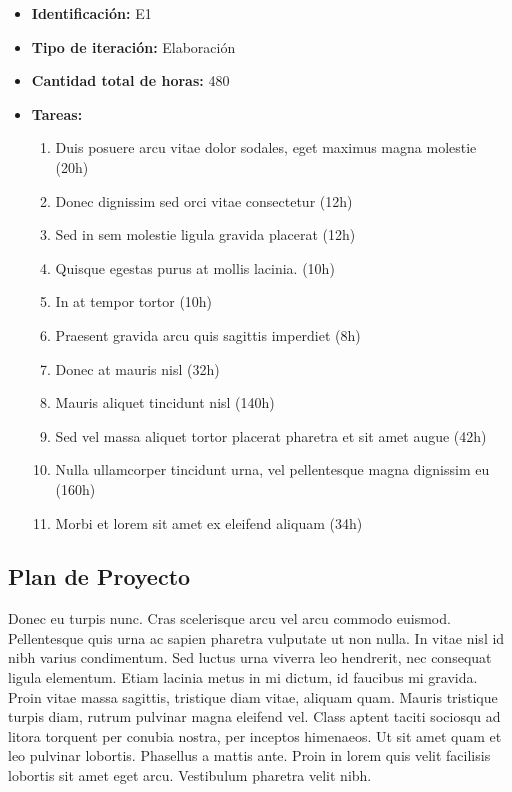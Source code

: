 \documentclass[a4paper, 10pt, twoside]{article}
\begin{document}
\begin{itemize}
  \item \textbf{Identificación:} E1
  \item \textbf{Tipo de iteración:} Elaboración
  \item \textbf{Cantidad total de horas:} 480
  \item \textbf{Tareas:}
\begin{enumerate}
  \item Duis posuere arcu vitae dolor sodales, eget maximus magna molestie (20h)
  \item Donec dignissim sed orci vitae consectetur (12h)
  \item Sed in sem molestie ligula gravida placerat (12h)
  \item Quisque egestas purus at mollis lacinia. (10h)
  \item In at tempor tortor (10h)
  \item Praesent gravida arcu quis sagittis imperdiet (8h)
  \item Donec at mauris nisl (32h)
  \item Mauris aliquet tincidunt nisl (140h)
  \item Sed vel massa aliquet tortor placerat pharetra et sit amet augue (42h)
  \item Nulla ullamcorper tincidunt urna, vel pellentesque magna dignissim eu (160h)
  \item Morbi et lorem sit amet ex eleifend aliquam (34h)
\end{enumerate}
\end{itemize}

\subsection{Plan de Proyecto}
Donec eu turpis nunc. Cras scelerisque arcu vel arcu commodo euismod. Pellentesque quis urna ac sapien pharetra vulputate ut non nulla. In vitae nisl id nibh varius condimentum. Sed luctus urna viverra leo hendrerit, nec consequat ligula elementum. Etiam lacinia metus in mi dictum, id faucibus mi gravida. Proin vitae massa sagittis, tristique diam vitae, aliquam quam. Mauris tristique turpis diam, rutrum pulvinar magna eleifend vel. Class aptent taciti sociosqu ad litora torquent per conubia nostra, per inceptos himenaeos. Ut sit amet quam et leo pulvinar lobortis. Phasellus a mattis ante. Proin in lorem quis velit facilisis lobortis sit amet eget arcu. Vestibulum pharetra velit nibh.
\end{document}
